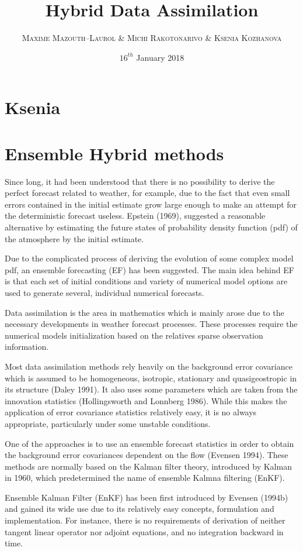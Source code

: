 \documentclass[a4,12pt]{article}
\title{\textbf{Hybrid Data Assimilation}}
\author{
\begin{tabular}{cc}
	\textsc{Maxime Mazouth--Laurol} \& \textsc{Michi Rakotonarivo} \& \textsc{Ksenia Kozhanova}
\end{tabular}}
\date{\small $16^{th}$ January 2018}
\begin{document}
\maketitle

\section{Ksenia}
\section{Ensemble Hybrid methods}

Since long, it had been understood that there is no possibility to derive the perfect forecast related to weather, for example, due to the fact that even small errors contained in the initial estimate grow large enough to make an attempt for the deterministic forecast useless. Epstein (1969), suggested a reasonable alternative by estimating the future states of probability density function (pdf)  of the atmosphere by the initial estimate.

Due to the complicated process of deriving the evolution of some complex model pdf, an ensemble forecasting (EF) has been suggested. The main idea behind EF is that each set of initial conditions and variety of numerical model options are used to generate several, individual numerical forecasts.

Data assimilation is the area in mathematics which is mainly arose due to the necessary developments in weather forecast processes. These processes require the numerical models initialization based on the relatives sparse observation information.  

Most data assimilation methods rely heavily on the background error covariance which is assumed to be homogeneous, isotropic, stationary and quasigeostropic in its structure (Daley 1991). It also uses some parameters which are taken from the innovation statistics (Hollingsworth and
Lonnberg 1986). While this makes the application of error covariance statistics relatively easy, it is no always appropriate, particularly under some unstable conditions.

One of the approaches is to use an ensemble forecast statistics in order to obtain the background error covariances dependent on the flow (Evensen 1994). These methods are normally based on the Kalman filter theory, introduced by Kalman in 1960, which predetermined the name of ensemble Kalmna filtering (EnKF).

Ensemble Kalman Filter (EnKF) has been first introduced by Evensen (1994b) and gained its wide use due to its relatively easy concepts, formulation and implementation. For instance, there is no requirements of derivation of neither tangent linear operator nor adjoint equations, and no integration backward in time.
\end{document}
